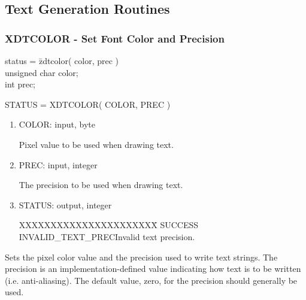 \subsection{Text Generation Routines}
\subsubsection{XDTCOLOR - Set Font Color and Precision}
\begin{tabbing}
status = \=zdtcolor( color, prec )\\
\>unsigned char  color;\\
\>int  prec;\\
\end{tabbing}
STATUS = XDTCOLOR( COLOR, PREC )
\begin{enumerate}
\item COLOR:  input, byte

Pixel value to be used when drawing text.
\item PREC:  input, integer

The precision to be used when drawing text.
\item STATUS:  output, integer
\begin{tabbing}
XXXXXXXXXXXXXXXXXXXXXX\=\kill
SUCCESS\\
INVALID\_TEXT\_PREC\>Invalid text precision.\\
\end{tabbing}
\end{enumerate}
Sets the pixel color value and the precision used to write text
strings.  The precision is an implementation-defined value indicating
how text is to be written (i.e. anti-aliasing).  The default
value, zero, for the precision should generally be used.
\newpage
